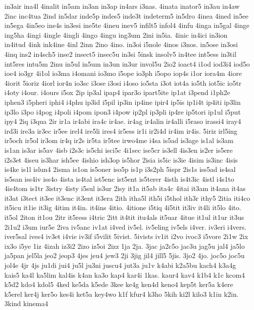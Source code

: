 {in3air
ina4l
4inalit
in5am
in3an
in3ap
in4ars
i3nas.
4inata
inator5
in3au
in4aw
2inc
inc4tua
2ind
in5dar
inde5p
indes5
inde3t
indeterm5
in5dro
4inea
4ined
in5ee
in5ega
4in5eo
ine4s
in3esi
ine5te
4ineu
inev5
infilt5
infol4
4infu
4inga
in5gal
4inge
ing5ha
4ingi
4ingle
4ingli
4ingo
4ingu
ing3um
2ini
in5ia.
4inic
in4ici
in3ion
in4itud
4ink
ink4ine
4inl
2inn
2ino
4ino.
in3oi
i5nole
4inos
i3nos.
in5ose
in3osi
4inq
ins2
in4sch5
inse2
insect5
insec5u
in3si
5insk
insolv5
in4tee
int5ess
in3til
int5res
intu5m
2inu
in5ul
in5um
in3un
in3ur
invol5u
2io2
ioact4
i1od
iod3i4
iod5o
ioe4
io3gr
4i1ol
io3ma
i4omani
io3mo
i5ope
io3ph
i5opo
iop4s
i1or
iora4m
4iore
4iorit
5ioriz
4iorl
ior4n
io3sc
i3ose
i3osi
i4oso
io5sta
i3ot
iot4a
io5th
iot5ic
io5tr
i4oty
i4our.
i4ours
i5ox
2ip
ip3al
ipap4
ipar3o
ipart5ite
ip1at
i3pend
i1ph2e
iphen3
i5pheri
iphi4
i4phu
ip3id
i5pil
ip3in
ip4ine
ipir4
ip5is
ip1i4t
ip4iti
ip3lin
ip3lo
i3po
i4pog
i4poli
i4pom
ipon3
i4pow
ip2pl
ip3pli
ip4re
ip5tori
ip1ul
i5put
ipy4
2iq
i3qua
2ir
ir1a
ir4abi
ira4c
ir4ae.
ir4ag
ir4alin
ir4alli
i5raso
irassi4
iray4
ird3i
ire3a
ir3ec
ir5ee
irel4
ire5li
ires4
ir5ess
ir1i
ir2i4d
ir4im
ir4is.
5iriz
irl5ing
ir5och
ir5ol
ir3om
ir4q
ir2s
ir5ta
ir5tee
irwo4me
i4sa
is5ad
is3age
is1al
is3am
is1an
is3ar
is5av
4isb
i2s3c
is5chi
isci5c
4i1sec
ise5cr
is3ell
4is3en
is2er
is5ere
i2s3et
4iseu
is3har
ish5ee
4ishio
ish3op
is5hor
2isia
is5ic
is3ie
4isim
is3inc
4isis
is4ke
is1l
islun4
2isma
is1on
is5oner
iso5p
is1p
i3s2ph
5ispr
2is1s
iss5ad
is4sal
is5san
iss4iv
iss4o
4ista
is4tal
ist5enc
ist5ent
is5terer
4isth
is4t3ic
4istl
i4s1to
4is4tom
is1tr
3istry
4isty
i5sul
is3ur
2isy
it1a
it5ab
ita4c
4itai
it3am
it4ana
it4as
it3at
i3tect
it3ee
it3enc
it3ent
it3era
2ith
itha5l
ith5i
i5thol
ith3r
ithy5
2itia
iti4co
it5icu
it1ie
it3ig
4itim
it4in.
it4ins
4itio.
4itione
i5tiq
4i5tit
it3iv
it4li
it5lo
4ito.
it5ol
2iton
it1ou
2itr
it5ress
i4tric
2itt
it4tit
itu4als
it5uar
4itue
it1ul
it1ur
it3us
2i1u2
i3um
iur5e
2iva
iv5anc
iv1at
i4ved
iv5el.
iv5eling
iv5els
i4ver.
iv3eri
i4vers.
iver5sal
ives4
iv3et
i4vie
iv3if
i5vilit
5ivist.
5ivists
iv1it
i2vo
ivoc3
i5vore
2i1w
2ix
ix3o
i5ye
1iz
4izah
iz3i2
2izo
iz5oi
2izz
1ja
2ja.
3jac
ja2c5o
jac3u
jag5u
jal4
ja5lo
ja5pan
jel5la
jeo2
jeop3
4jes
jeu4
jew3
2ji
3jig
jil4
jill5
5jis.
3jo2
4jo.
joc5o
joc5u
jol4e
4jr
4js
ju1di
jui4
ju5l
ju3ni
juscu4
jut3a
ju1v
k4abi
k2a5bu
kach4
k3a4g
kais5
ka4l
ka5lim
kal4is
k4an
ka3o
kap4
kar4i
1kas.
kaur4
kav4
k1b4
k1c
kcom4
k5d2
kdo4
kdol5
4ked
ke5da
k5ede
3kee
ke4g
ken4d
keno4
kep5t
ker5a
k4ere
k5erel
ker4j
ker5o
kes4i
ket5a
key4wo
k1f
kfur4
k3ho
5kih
ki2l
kilo3
k1in
k2in.
3kind
kinema4
}
